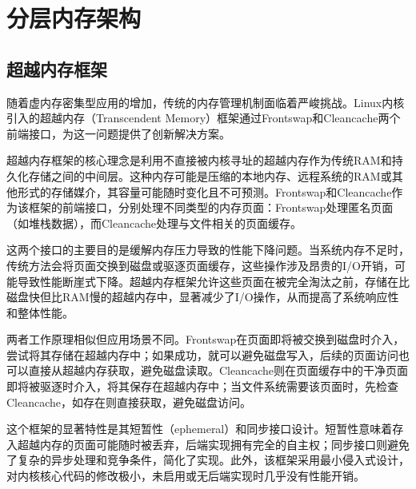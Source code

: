 \section{分层内存架构}

\subsection{超越内存框架}

随着虚内存密集型应用的增加，传统的内存管理机制面临着严峻挑战。Linux内核引入的超越内存（Transcendent Memory）框架通过Frontswap和Cleancache两个前端接口，为这一问题提供了创新解决方案。

超越内存框架的核心理念是利用不直接被内核寻址的超越内存作为传统RAM和持久化存储之间的中间层。这种内存可能是压缩的本地内存、远程系统的RAM或其他形式的存储媒介，其容量可能随时变化且不可预测。Frontswap和Cleancache作为该框架的前端接口，分别处理不同类型的内存页面：Frontswap处理匿名页面（如堆栈数据），而Cleancache处理与文件相关的页面缓存。

这两个接口的主要目的是缓解内存压力导致的性能下降问题。当系统内存不足时，传统方法会将页面交换到磁盘或驱逐页面缓存，这些操作涉及昂贵的I/O开销，可能导致性能断崖式下降。超越内存框架允许这些页面在被完全淘汰之前，存储在比磁盘快但比RAM慢的超越内存中，显著减少了I/O操作，从而提高了系统响应性和整体性能。

两者工作原理相似但应用场景不同。Frontswap在页面即将被交换到磁盘时介入，尝试将其存储在超越内存中；如果成功，就可以避免磁盘写入，后续的页面访问也可以直接从超越内存获取，避免磁盘读取。Cleancache则在页面缓存中的干净页面即将被驱逐时介入，将其保存在超越内存中；当文件系统需要该页面时，先检查Cleancache，如存在则直接获取，避免磁盘访问。

这个框架的显著特性是其短暂性（ephemeral）和同步接口设计。短暂性意味着存入超越内存的页面可能随时被丢弃，后端实现拥有完全的自主权；同步接口则避免了复杂的异步处理和竞争条件，简化了实现。此外，该框架采用最小侵入式设计，对内核核心代码的修改极小，未启用或无后端实现时几乎没有性能开销。



